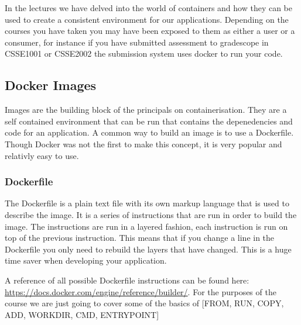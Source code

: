 \documentclass{csse4400}
\begin{document}
In the lectures we have delved into the world of containers and how they can be used to create a consistent environment for our applications. Depending on the courses you have taken you may have been exposed to them as either a user or a consumer, for instance if you have submitted assessment to gradescope in CSSE1001 or CSSE2002 the submission system uses docker to run your code.\\



\subsection{Docker Images}

Images are the building block of the principals on containerisation. They are a self contained environment that can be run that contains the depenedencies and code for an application. A common way to build an image is to use a Dockerfile. Though Docker was not the first to make this concept, it is very popular and relativly easy to use.

\subsubsection{Dockerfile}

The Dockerfile is a plain text file with its own markup language that is used to describe the image. It is a series of instructions that are run in order to build the image. The instructions are run in a layered fashion, each instruction is run on top of the previous instruction. This means that if you change a line in the Dockerfile you only need to rebuild the layers that have changed. This is a huge time saver when developing your application.

A reference of all possible Dockerfile instructions can be found here: \url{https://docs.docker.com/engine/reference/builder/}. For the purposes of the course we are just going to cover some of the basics of [FROM, RUN, COPY, ADD, WORKDIR, CMD, ENTRYPOINT]
\end{document}
